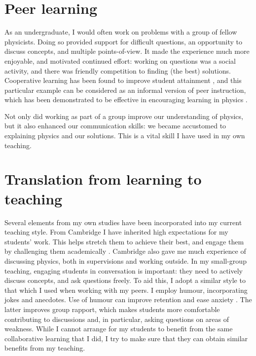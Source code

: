 \section{Peer learning}\label{sec:peer}

As an undergraduate, I would often work on problems with a group of fellow physicists. Doing so provided support for difficult questions, an opportunity to discuss concepts, and multiple points-of-view. It made the experience much more enjoyable, and motivated continued effort: working on questions was a social activity, and there was friendly competition to finding (the best) solutions. Cooperative learning has been found to improve student attainment \citep{Qin1995,Cabrera2002}, and this particular example can be considered as an informal version of peer instruction, which has been demonstrated to be effective in encouraging learning in physics \citep{Crouch2001,Pilzer2001,Miller2006}.

Not only did working as part of a group improve our understanding of physics, but it also enhanced our communication skills: we became accustomed to explaining physics and our solutions. This is a vital skill I have used in my own teaching.

\section{Translation from learning to teaching}

Several elements from my own studies have been incorporated into my current teaching style. From Cambridge I have inherited high expectations for my students' work. This helps stretch them to achieve their best, and engage them by challenging them academically \citep{Bamber2015}. Cambridge also gave me much experience of discussing physics, both in supervisions and working outside. In my small-group teaching, engaging students in conversation is important: they need to actively discuss concepts, and ask questions freely. To aid this, I adopt a similar style to that which I used when working with my peers. I employ humour, incorporating jokes and anecdotes. Use of humour can improve retention and ease anxiety \citep[e.g.,][and references therein]{Korobkin1988,Lesser2008}. The latter improves group rapport, which makes students more comfortable contributing to discussions and, in particular, asking questions on areas of weakness. While I cannot arrange for my students to benefit from the same collaborative learning that I did, I try to make sure that they can obtain similar benefits from my teaching.
